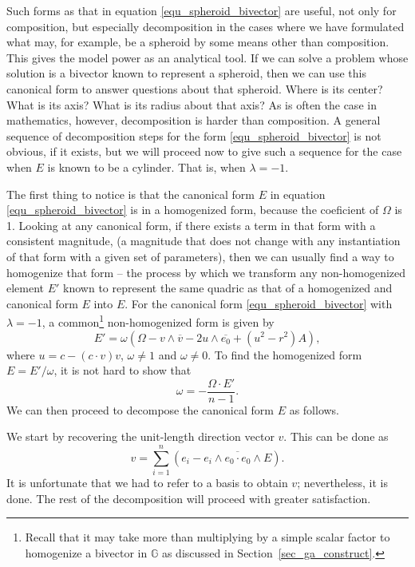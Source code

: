 \documentclass{birkjour}
\theoremstyle{definition}
\theoremstyle{remark}
\numberwithin{equation}{section}
\newcommand{\G}{\mathbb{G}}
\begin{document}
Such forms as that in equation \eqref{equ_spheroid_bivector} are useful, not only
for composition, but especially decomposition in the cases
where we have formulated what may, for example, be a spheroid by some means
other than composition.
This gives the model power as an analytical tool.  If we can solve a problem whose solution
is a bivector known to represent a spheroid, then we can use this canonical form to answer
questions about that spheroid.  Where is its center?  What is its axis?  What is its radius
about that axis?  As is often the case in mathematics, however, decomposition is
harder than composition.  A general sequence of decomposition steps for the
form \eqref{equ_spheroid_bivector} is not obvious, if it exists, but we will
proceed now to give such a sequence for the case when $E$ is known
to be a cylinder.  That is, when $\lambda=-1$.

The first thing to notice is that the canonical form $E$ in equation \eqref{equ_spheroid_bivector}
is in a homogenized form, because the coeficient of $\Omega$ is 1.  Looking at any canonical form,
if there exists a term in that form with a consistent magnitude, (a magnitude that does not change
with any instantiation of that form with a given set of parameters), then we can usually find a way
to homogenize that form -- the process by which we transform any non-homogenized element $E'$
known to represent the same quadric as that of a homogenized and canonical form $E$ into $E$.
For the canonical form \eqref{equ_spheroid_bivector} with $\lambda=-1$, a common\footnote{Recall
that it may take more than multiplying by a simple scalar factor to homogenize a bivector in $\G$
as discussed in Section~\ref{sec_ga_construct}.}
non-homogenized form is given by
\begin{equation}
E' = \omega(\Omega - v\wedge\overline{v}-2u\wedge\overline{e_0}+(u^2-r^2)A),
\end{equation}
where $u=c-(c\cdot v)v$, $\omega\neq 1$ and $\omega\neq 0$.  To find the homogenized form $E=E'/\omega$,
it is not hard to show that
\begin{equation}
\omega = -\frac{\Omega\cdot E'}{n-1}.
\end{equation}
We can then proceed to decompose the canonical form $E$ as follows.

We start by recovering the unit-length direction vector $v$.  This can be
done as
\begin{equation}
v = \sum_{i=1}^n\left(e_i-\overline{e_i\wedge e_0\cdot e_0\wedge E}\right).
\end{equation}
It is unfortunate that we had to refer to a basis to obtain $v$; nevertheless,
it is done.  The rest of the decomposition will proceed with greater satisfaction.
\end{document}
